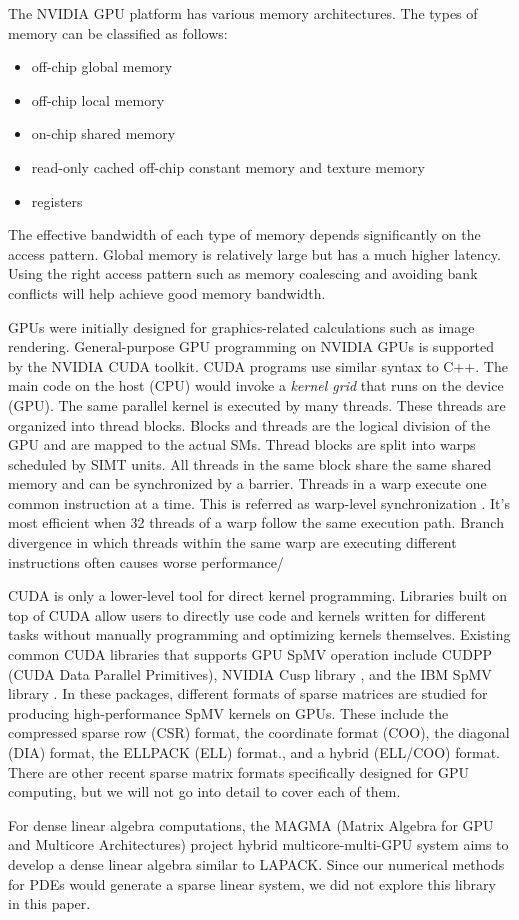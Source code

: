 The NVIDIA GPU platform has various memory architectures. The types of memory can be classified as follows:
\begin{itemize}
    \item off-chip global memory
    \item off-chip local memory
    \item on-chip shared memory
    \item read-only cached off-chip constant memory and texture memory
    \item registers
\end{itemize}

The effective bandwidth of each type of memory depends significantly on the access pattern. Global memory is relatively large but has a much higher latency. Using the right access pattern such as memory coalescing and avoiding bank conflicts will help achieve good memory bandwidth.


GPUs were initially designed for graphics-related calculations such as image rendering. General-purpose GPU programming on NVIDIA GPUs is supported by the NVIDIA CUDA toolkit. CUDA programs use similar syntax to C++. The main code on the host (CPU) would invoke a \textit{kernel grid} that runs on the device (GPU). The same parallel kernel is executed by many threads. These threads are organized into thread blocks. Blocks and threads are the logical division of the GPU and are mapped to the actual SMs. Thread blocks are split into warps scheduled by SIMT units. All threads in the same block share the same shared memory and can be synchronized by a barrier. Threads in a warp execute one common instruction at a time. This is referred as warp-level synchronization \cite{wilt2013cuda}. It's most efficient when 32 threads of a warp follow the same execution path. Branch divergence in which threads within the same warp are executing different instructions often causes worse performance/

CUDA is only a lower-level tool for direct kernel programming. Libraries built on top of CUDA allow users to directly use code and kernels written for different tasks without manually programming and optimizing kernels themselves. Existing common CUDA libraries that supports GPU SpMV operation include CUDPP (CUDA Data Parallel Primitives)\cite{harris2007cudpp}, NVIDIA Cusp library \cite{dalton2014cusp}, and the IBM SpMV library \cite{baskaran2009optimizing}. In these packages, different formats of sparse matrices are studied for producing high-performance SpMV kernels on GPUs. These include the compressed sparse row (CSR) format, the coordinate format (COO), the diagonal (DIA) format, the ELLPACK (ELL) format., and a hybrid (ELL/COO) format. There are other recent sparse matrix formats specifically designed for GPU computing, but we will not go into detail to cover each of them.

For dense linear algebra computations, the MAGMA (Matrix Algebra for GPU and Multicore Architectures) project hybrid multicore-multi-GPU system aims to develop a dense linear algebra similar to LAPACK\cite{agullo2009numerical}. Since our numerical methods for PDEs would generate a sparse linear system, we did not explore this library in this paper.


